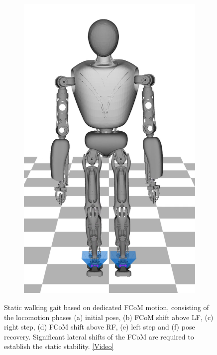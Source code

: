 \begin{figure}
\begin{subfigure}{.16\textwidth}
	\includegraphics[width=.95\linewidth]{fig/walkStatic/snaps/9}
	\caption{}
\end{subfigure}
\caption[Static walking based on dedicated \gls{FCoM} shifting]{Static walking gait based on dedicated \gls{FCoM} motion, consisting of the locomotion phases (a) initial pose, (b) \gls{FCoM} shift above \gls{LF}, (c) right step, (d) \gls{FCoM} shift above \gls{RF}, (e) left step and (f) pose recovery. Significant lateral shifts of the \gls{FCoM} are required to establish the static stability. \href{https://github.com/julesser/ma-thesis-simulation-results/blob/master/HumanoidFixedArms/StaticWalking_NoCoPCost_ComHeightConstant/crocoddyl.mp4}{[Video]}}
\label{fig:walkStatic_Snaps}
\end{figure}

